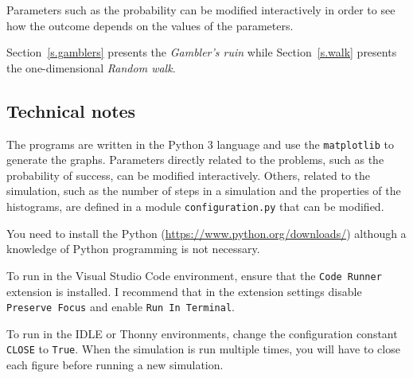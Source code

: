 Parameters such as the probability can be modified interactively in order to see how the outcome depends on the values of the parameters.

Section~\ref{s.gamblers} presents the \emph{Gambler's ruin} while Section~\ref{s.walk} presents the one-dimensional \emph{Random walk}.

\subsection*{Technical notes}

The programs are written in the Python 3 language and use the \verb+matplotlib+ to generate the graphs. Parameters directly related to the problems, such as the probability of success, can be modified interactively. Others, related to the simulation, such as the number of steps in a simulation and the properties of the histograms, are defined in a module \verb+configuration.py+ that can be modified.

You need to install the Python (\url{https://www.python.org/downloads/}) although a knowledge of Python programming is not necessary.

To run in the Visual Studio Code environment, ensure that the \verb+Code Runner+ extension is installed. I recommend that in the extension settings disable \verb+Preserve Focus+ and enable \verb+Run In Terminal+.

To run in the IDLE or Thonny environments, change the configuration constant \verb+CLOSE+ to \verb+True+. When the simulation is run multiple times, you will have to close each figure before running a new simulation.
